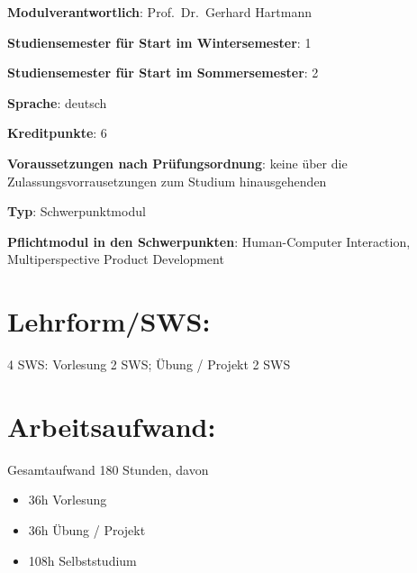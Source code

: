\begin{modulHead}
\textbf{Modulverantwortlich}: Prof.~Dr.~Gerhard
Hartmann
\end{modulHead}
\begin{modulHead}
\textbf{Studiensemester für
Start im Wintersemester}:
1
\end{modulHead}
\begin{modulHead}
\textbf{Studiensemester für Start
im Sommersemester}:
2
\end{modulHead}
\begin{modulHead}
\textbf{Sprache}:
deutsch
\end{modulHead}
\begin{modulHead}
\textbf{Kreditpunkte}:
6
\end{modulHead}
\begin{modulHead}
\textbf{Voraussetzungen nach
Prüfungsordnung}: keine über die Zulassungsvorrausetzungen zum Studium
hinausgehenden
\end{modulHead}
\begin{modulHead}
\textbf{Typ}:
Schwerpunktmodul
\end{modulHead}
\begin{modulHead}
\textbf{Pflichtmodul
in den Schwerpunkten}: Human-Computer Interaction, Multiperspective
Product Development
\end{modulHead}


\section*{Lehrform/SWS:\label{/mi-2017/modulbeschreibungen-master/MA_HCI_InteractionDesign}}\label{lehrformswspathlabelmi-2017modulbeschreibungen-mastermaux5fhciux5finteractiondesign}

4 SWS: Vorlesung 2 SWS; Übung / Projekt 2 SWS

\section*{Arbeitsaufwand:\label{/mi-2017/modulbeschreibungen-master/MA_HCI_InteractionDesign}}\label{arbeitsaufwandpathlabelmi-2017modulbeschreibungen-mastermaux5fhciux5finteractiondesign}

Gesamtaufwand 180 Stunden, davon

\begin{itemize}
\tightlist
\item
  36h Vorlesung
\item
  36h Übung / Projekt
\item
  108h Selbststudium
\end{itemize}

